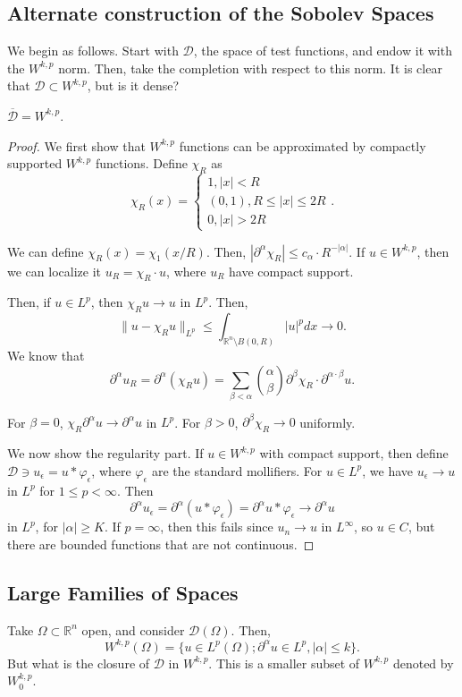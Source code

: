 \documentclass[11pt]{scrartcl}
\newcommand{\R}{\mathbb{R}}
\let \phi \varphi
\let \mc \mathcal
\begin{document}
\subsection{Alternate construction of the Sobolev Spaces}
We begin as follows.  Start with $\mathcal D$, the space of test functions, and endow it with the $W^{k, p}$ norm.  Then, take the completion with respect to this norm.  It is clear that $\mathcal D \subset W^{k, p}$, but is it dense?

\begin{proposition} $\overline{\mc D} = W^{k, p}$.
\end{proposition}
\begin{proof}
We first show that $W^{k, p}$ functions can be approximated by compactly supported $W^{k, p}$ functions.  Define $\chi_R$ as 
$$\chi_R(x) = \begin{cases}
1, |x| < R\\
(0, 1), R \le |x| \le 2R \\
0, |x| > 2R
\end{cases}.$$

We can define $\chi_R(x) = \chi_1(x/R)$.  Then, $|\partial^\alpha \chi_R| \le c_\alpha \cdot R^{-|\alpha|}.$  If $u \in W^{k, p}$, then we can localize it $u_R = \chi_R \cdot u$, where $u_R$ have compact support. 

Then, if $u \in L^p$, then $\chi_R u \to u$ in $L^p$.  Then,
$$\|u - \chi_R u\|_{L^p} \le \int_{\R^n\setminus B(0, R)} |u|^p dx \to 0.$$
We know that $$\partial^\alpha u_R = \partial^\alpha(\chi_R u) = \sum_{\beta < \alpha} \binom{\alpha}{\beta} \partial^\beta \chi_R \cdot \partial^{\alpha \cdot \beta} u.$$

For $\beta = 0$, $\chi_R \partial^\alpha u \to \partial^\alpha u$ in $L^p$.   For $\beta > 0$, $\partial^\beta \chi_R \to 0$ uniformly.

We now show the regularity part.  If $u \in W^{k, p}$ with compact support, then define $\mathcal D \ni u_\epsilon = u * \phi_\epsilon$, where $\phi_\epsilon$ are the standard mollifiers.  For $u \in L^p$, we have $u_\epsilon \to u$ in $L^p$ for $1 \le p < \infty$.  Then
$$\partial^\alpha u_\epsilon = \partial^\alpha(u * \phi_\epsilon) = \partial^\alpha u * \phi_\epsilon \to \partial^\alpha u$$
in $L^p$, for $|\alpha| \ge K$.  If $p = \infty$, then this fails since $u_n \to u$ in $L^\infty$, so $u \in C$, but there are bounded functions that are not continuous.  
\end{proof}
\subsection{Large Families of Spaces} 
Take $\Omega \subset \R^n$ open, and consider $\mc D(\Omega)$.  Then,
$$W^{k, p}(\Omega) = \{u \in L^p(\Omega); \partial^\alpha u \in L^p, |\alpha| \le k\}.$$
But what is the closure of $\mathcal D$ in $W^{k, p}$.  This is a smaller subset of $W^{k, p}$ denoted by $W_0^{k, p}$.
\end{document}
